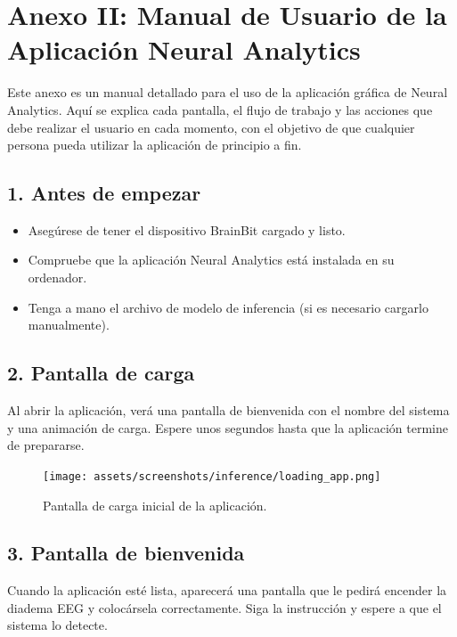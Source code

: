 \chapter*{Anexo II: Manual de Usuario de la Aplicación Neural Analytics}

Este anexo es un manual detallado para el uso de la aplicación gráfica de Neural Analytics. Aquí se explica cada pantalla, el flujo de trabajo y las acciones que debe realizar el usuario en cada momento, con el objetivo de que cualquier persona pueda utilizar la aplicación de principio a fin.

\section*{1. Antes de empezar}
\begin{itemize}
    \item Asegúrese de tener el dispositivo BrainBit cargado y listo.
    \item Compruebe que la aplicación Neural Analytics está instalada en su ordenador.
    \item Tenga a mano el archivo de modelo de inferencia (si es necesario cargarlo manualmente).
\end{itemize}

\section*{2. Pantalla de carga}
Al abrir la aplicación, verá una pantalla de bienvenida con el nombre del sistema y una animación de carga. Espere unos segundos hasta que la aplicación termine de prepararse.

\begin{figure}[h!]
    \centering
    \texttt{[image: assets/screenshots/inference/loading\_app.png]}
    \caption{Pantalla de carga inicial de la aplicación.}
\end{figure}

\section*{3. Pantalla de bienvenida}
Cuando la aplicación esté lista, aparecerá una pantalla que le pedirá encender la diadema EEG y colocársela correctamente. Siga la instrucción y espere a que el sistema lo detecte.


